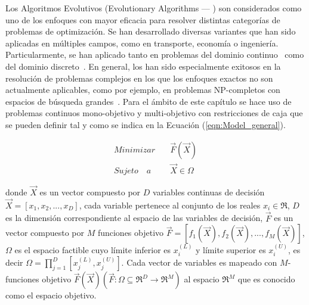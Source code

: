 Los Algoritmos Evolutivos (Evolutionary Algorithms --- \EAS{}) son considerados como uno de los enfoques con mayor eficacia para resolver distintas categorías de 
problemas de optimización.
%
Se han desarrollado diversas variantes que han sido aplicadas en múltiples campos, como en transporte, economía o ingeniería.
%
Particularmente, se han aplicado tanto en problemas del dominio continuo~\cite{glover2005handbook} como del dominio discreto~\cite{Joel:Dynamic_FAP}.
%
En general, los \EAS{} han sido especialmente exitosos en la resolución de problemas complejos en los que los enfoques exactos
no son actualmente aplicables, como por ejemplo, en problemas NP-completos con espacios de búsqueda grandes~\cite{chakraborty2008advances}.
% 
Para el ámbito de este capítulo se hace uso de problemas continuos mono-objetivo y multi-objetivo con restricciones de caja que se pueden definir 
tal y como se indica en la Ecuación (\ref{eqn:Model_general}).

\begin{equation}
 \label{eqn:Model_general}
   \begin{split}
    Minimizar \quad & \vec{F}(\vec{X})\\
   Sujeto \quad a \quad & \vec{X} \in \Omega
   \end{split}
\end{equation}

donde $\vec{X}$ es un vector compuesto por $D$ variables continuas de decisión $\vec{X} = [x_1, x_2, ..., x_D]$, 
cada variable pertenece al conjunto de los reales $x_i \in \Re$,
$D$ es la dimensión correspondiente al espacio de las variables de decisión, $\vec{F}$ es un vector compuesto por $M$ funciones objetivo $\vec{F} = [f_1(\vec{X}), f_2(\vec{X}), ..., f_M(\vec{X})]$,
$\Omega$ es el espacio factible cuyo límite inferior es $x_i^{(L)}$ y límite superior es $x_i^{(U)}$, es decir $\Omega = \prod _{j=1}^D[x_j^{(L)}, x_j^{(U)}]$. 
Cada vector de variables es mapeado con $M$-funciones objetivo $\vec{F}(\vec{X})( \vec{F} : \Omega \subseteq \Re^D \rightarrow \Re^M)$ al espacio $\Re^M$ que es conocido como el espacio objetivo.

